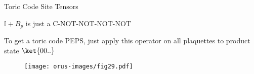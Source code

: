 \begin{frame}{Toric Code Site Tensors}
\bi 
\item $\mathbb{I} + B_p$ is just a C-NOT-NOT-NOT-NOT
\item To get a toric code PEPS, just apply this operator on all plaquettes to product state $\ket{00..}$
\begin{figure}
\centering
\texttt{[image: orus-images/fig29.pdf]}
\end{figure}
\ei
\end{frame}